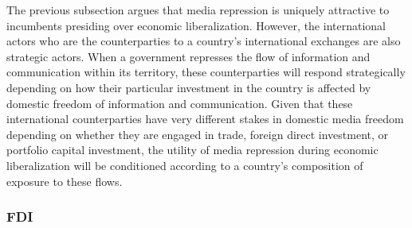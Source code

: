 \documentclass[12pt]{report}
\begin{document}
The previous subsection argues that media repression is uniquely attractive to incumbents presiding
over economic liberalization. However, the international actors who are the counterparties to a
country's international exchanges are also strategic actors. When a government represses the flow of
information and communication within its territory, these counterparties will respond strategically
depending on how their particular investment in the country is affected by domestic freedom of
information and communication. Given that these international counterparties have very different
stakes in domestic media freedom depending on whether they are engaged in trade, foreign direct
investment, or portfolio capital investment, the utility of media repression during economic
liberalization will be conditioned according to a country's composition of exposure to these flows.

\subsubsection{FDI}
\end{document}
